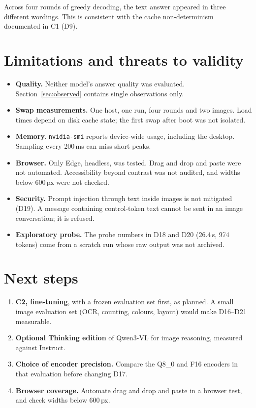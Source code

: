 \documentclass[11pt,a4paper]{article}
\newcommand{\code}[1]{\texttt{#1}}
\begin{document}
Across four rounds of greedy decoding, the text answer appeared in three different
wordings. This is consistent with the cache non-determinism documented in C1 (D9).

\section{Limitations and threats to validity}

\begin{itemize}
  \item \textbf{Quality.} Neither model's answer quality was evaluated.
        Section~\ref{sec:observed} contains single observations only.
  \item \textbf{Swap measurements.} One host, one run, four rounds and two images. Load
        times depend on disk cache state; the first swap after boot was not isolated.
  \item \textbf{Memory.} \code{nvidia-smi} reports device-wide usage, including the
        desktop. Sampling every 200\,ms can miss short peaks.
  \item \textbf{Browser.} Only Edge, headless, was tested. Drag and drop and paste were
        not automated. Accessibility beyond contrast was not audited, and widths below
        600\,px were not checked.
  \item \textbf{Security.} Prompt injection through text inside images is not mitigated
        (D19). A message containing control-token text cannot be sent in an image
        conversation; it is refused.
  \item \textbf{Exploratory probe.} The probe numbers in D18 and D20 (26.4\,s,
        974 tokens) come from a scratch run whose raw output was not archived.
\end{itemize}

\section{Next steps}

\begin{enumerate}
  \item \textbf{C2, fine-tuning}, with a frozen evaluation set first, as planned. A small
        image evaluation set (OCR, counting, colours, layout) would make D16--D21
        measurable.
  \item \textbf{Optional Thinking edition} of Qwen3-VL for image reasoning, measured
        against Instruct.
  \item \textbf{Choice of encoder precision.} Compare the Q8\_0 and F16 encoders in that
        evaluation before changing D17.
  \item \textbf{Browser coverage.} Automate drag and drop and paste in a browser test,
        and check widths below 600\,px.
\end{enumerate}
\end{document}
